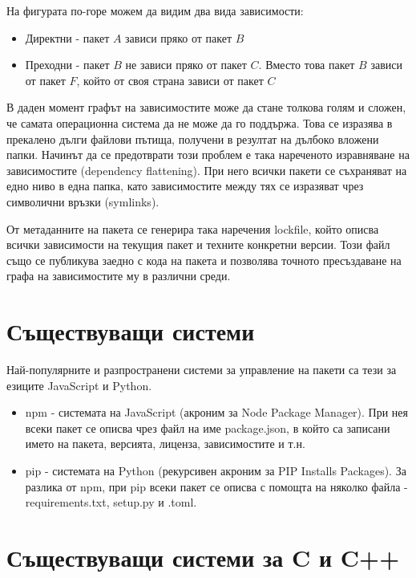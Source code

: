 На фигурата по-горе можем да видим два вида зависимости:

\begin{itemize}
    \item Директни - пакет \(A\) зависи пряко от пакет \(B\)
    \item Преходни - пакет \(B\) не зависи пряко от пакет \(C\). Вместо това
          пакет \(B\) зависи от пакет \(F\), който от своя страна зависи от
          пакет \(C\)
\end{itemize}

В даден момент графът на зависимостите може да стане толкова голям и сложен, че
самата операционна система да не може да го поддържа. Това се изразява в
прекалено дълги файлови пътища, получени в резултат на дълбоко вложени папки.
Начинът да се предотврати този проблем е така нареченото изравняване на
зависимостите (dependency flattening). При него всички пакети се съхраняват на
едно ниво в една папка, като зависимостите между тях се изразяват чрез
символични връзки (symlinks).

От метаданните на пакета се генерира така наречения lockfile, който описва
всички зависимости на текущия пакет и техните конкретни версии. Този файл също
се публикува заедно с кода на пакета и позволява точното пресъздаване на графа
на зависимостите му в различни среди.


\section{Съществуващи системи}

Най-популярните и разпространени системи за управление на пакети са тези за
езиците JavaScript и Python.

\begin{itemize}
    \item npm - системата на JavaScript (акроним за Node Package Manager). При
          нея всеки пакет се описва чрез файл на име package.json, в който са
          записани името на пакета, версията, лиценза, зависимостите и т.н.
    \item pip - системата на Python (рекурсивен акроним за PIP Installs
          Packages). За разлика от npm, при pip всеки пакет се описва с помощта
          на няколко файла - requirements.txt, setup.py и .toml.
\end{itemize}


\section{Съществуващи системи за C и C++}

